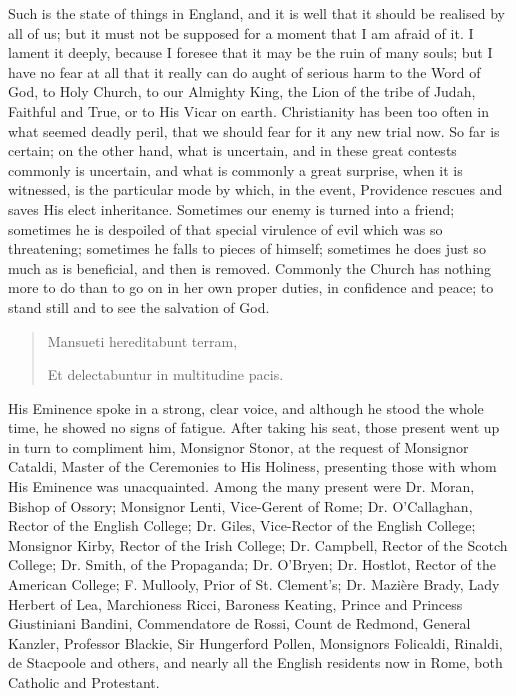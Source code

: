 Such is the state of things in England, and it is well that it
should be realised by all of us; but it must not be supposed for a
moment that I am afraid of it. I lament it deeply, because I foresee
that it may be the ruin of many souls; but I have no fear at all that
it really can do aught of serious harm to the Word of God, to Holy
Church, to our Almighty King, the Lion of the tribe of Judah, Faithful
and True, or to His Vicar on earth. Christianity has been too often in
what seemed deadly peril, that we should fear for it any new trial
now. So far is certain; on the other hand, what is uncertain, and in
these great contests commonly is uncertain, and what is commonly a
great surprise, when it is witnessed, is the particular mode by which,
in the event, Providence rescues and saves His elect inheritance.
Sometimes our enemy is turned into a friend; sometimes he is despoiled
of that special virulence of evil which was so threatening;
sometimes he falls to pieces of himself; sometimes he does just so
much as is beneficial, and then is removed. Commonly the Church has
nothing more to do than to go on in her own proper duties, in
confidence and peace; to stand still and to see the salvation of God.

\begin{quote}

Mansueti hereditabunt terram,

Et delectabuntur in multitudine pacis.

\end{quote}

His Eminence spoke in a strong, clear voice, and although he stood
the whole time, he showed no signs of fatigue. After taking his seat,
those present went up in turn to compliment him, Monsignor Stonor, at
the request of Monsignor Cataldi, Master of the Ceremonies to His
Holiness, presenting those with whom His Eminence was unacquainted.
Among the many present were Dr. Moran, Bishop of Ossory; Monsignor
Lenti, Vice-Gerent of Rome; Dr. O'Callaghan, Rector of the English
College; Dr. Giles, Vice-Rector of the English College; Monsignor
Kirby, Rector of the Irish College; Dr. Campbell, Rector of the Scotch
College; Dr. Smith, of the Propaganda; Dr. O'Bryen; Dr. Hostlot,
Rector of the American College; F. Mullooly, Prior of St. Clement's;
Dr. Mazière Brady, Lady Herbert of Lea, Marchioness Ricci, Baroness
Keating, Prince and Princess Giustiniani Bandini, Commendatore de
Rossi, Count de Redmond, General Kanzler, Professor Blackie, Sir
Hungerford Pollen, Monsignors Folicaldi, Rinaldi, de Stacpoole and
others, and nearly all the English residents now in Rome, both
Catholic and Protestant.

